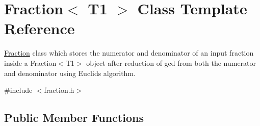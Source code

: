 \hypertarget{class_fraction}{}\section{Fraction$<$ T1 $>$ Class Template Reference}
\label{class_fraction}


\mbox{\hyperlink{class_fraction}{Fraction}} class which stores the numerator and denominator of an input fraction inside a Fraction$<$\+T1$>$ object after reduction of gcd from both the numerator and denominator using Euclid\textquotesingle{}s algorithm.  




{\ttfamily \#include $<$fraction.\+h$>$}

\subsection*{Public Member Functions}
